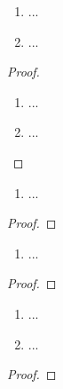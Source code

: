 \documentclass[12pt]{scrreprt}
\begin{document}
\begin{kor}\label{}
\begin{enumerate}
\item ...
\item ...
\end{enumerate}
\end{kor}
\begin{bem*}

\end{bem*}
\begin{proof}
\begin{enumerate}
\item ...
\item ...
\end{enumerate}
\end{proof}

\begin{dfn}\label{}

\end{dfn}
\begin{bem*}

\end{bem*}

\begin{satz}\label{}

\end{satz}
\begin{bsp}\label{}
\begin{enumerate}
\item ...
\end{enumerate}
\end{bsp}
\begin{proof}

\end{proof}

\begin{bsp}\label{}
\begin{enumerate}
\item ...
\end{enumerate}
\end{bsp}
\begin{proof}

\end{proof}

\begin{thm}\label{}
\begin{enumerate}
\item ...
\item ...
\end{enumerate}
\end{thm}
\begin{proof}

\end{proof}
\end{document}
